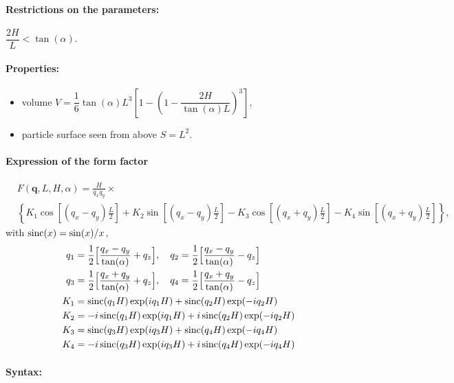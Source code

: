 \paragraph{Restrictions on the parameters:}  $\dfrac{2H}{L} < \tan(\alpha)$.

\paragraph{Properties:}
\begin{itemize}
\item  volume $V = \dfrac{1}{6} \tan(\alpha) L^3\left[ 1
             - \left(1 - \dfrac{2H}{\tan(\alpha)L}\right)^3 \right],$
\item particle surface seen from above $S = L^2$.
\end{itemize}

\paragraph{Expression of the form factor}
\begin{align*}
&F(\mathbf{q},L, H, \alpha) =
\frac{H}{q_x q_y} \times \nonumber \\ &\left\{ K_1 \cos\left[
  (q_x-q_y)\frac{L}{2} \right] + K_2 \sin\left[ (q_x-q_y)\frac{L}{2} \right]
- K_3 \cos\left[ (q_x+q_y) \frac{L}{2} \right] - K_4 \sin\left[ (q_x+q_y)\frac{L}{2} \right]\right\},
\end{align*}
with $\operatorname{sinc}(x)=\sin(x)/x$,
\begin{align*}
       q_1 &=\frac{1}{2}\Big[\frac{q_x-q_y}{\tan(\alpha)} + q_z\Big],\quad       q_2 =\frac{1}{2}\Big[\frac{q_x-q_y}{\tan(\alpha)} - q_z\Big]\\
        q_3 &=\frac{1}{2}\Big[\frac{q_x+q_y}{\tan(\alpha)} + q_z\Big],\quad       q_4 =\frac{1}{2}\Big[\frac{q_x+q_y}{\tan(\alpha)} - q_z\Big]\\
        K_1 &= \operatorname{sinc}(q_1 H)\exp(i q_1 H)  + \operatorname{sinc}(q_2 H) \exp(-i q_2 H)\\
        K_2 &= -i \operatorname{sinc}(q_1 H) \exp(i q_1 H) +i \operatorname{sinc}(q_2 H) \exp(-i q_2 H)\\
        K_3 &= \operatorname{sinc}(q_3 H) \exp(i q_3 H)    + \operatorname{sinc}(q_4 H) \exp(-i q_4 H)\\
        K_4 &= -i \operatorname{sinc}(q_3 H) \exp(i q_3 H) + i \operatorname{sinc}(q_4 H) \exp(-i q_4 H) 
   \end{align*}

\paragraph{Syntax:}  

